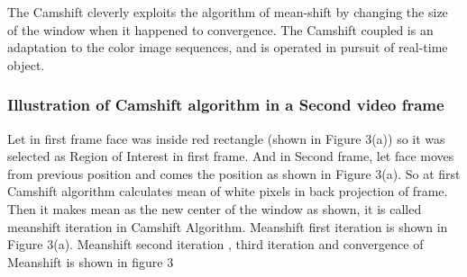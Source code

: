 \documentclass[11pt,a4paper]{article}
\begin{document}
			The Camshift cleverly exploits the algorithm of mean-shift by changing the size of the window when it happened to convergence. The Camshift coupled is an adaptation to the color image sequences, and is operated in pursuit of real-time object.
			
			\subsubsection{Illustration of Camshift algorithm in a Second video frame}
				Let in first frame face was inside red rectangle (shown in Figure 3(a)) so it was selected as Region of Interest in first frame. And in Second frame, let face moves from previous position and comes the position as shown in Figure 3(a). So at first Camshift algorithm calculates mean of white pixels in back projection of frame. Then it makes mean as the new center of the window as shown, it is called meanshift iteration in Camshift Algorithm. Meanshift first iteration is shown in Figure 3(a). Meanshift second iteration , third iteration and convergence of Meanshift is shown in figure 3
\end{document}
